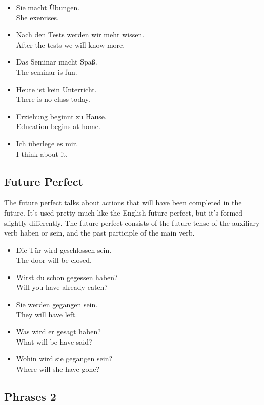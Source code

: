 \begin{itemize}
  \item  Sie macht {\"U}bungen. \\ 
  She exercises.
  \item  Nach den Tests werden wir mehr wissen. \\
  After the tests we will know more.
  \item  Das Seminar macht Spa{\ss}. \\
  The seminar is fun.
  \item  Heute ist kein Unterricht. \\
  There is no class today.
  \item  Erziehung beginnt zu Hause. \\
  Education begins at home.
  \item  Ich {\"u}berlege es mir. \\
  I think about it.
\end{itemize}


\pagebreak
\subsection{Future Perfect}

The future perfect talks about actions that will have been completed in the future. It's used pretty much like the English future perfect, but it's formed slightly differently.  The future perfect consists of the future tense of the auxiliary verb haben or sein, and the past participle of the main verb. 

\begin{itemize}
  \item  Die T{\"u}r wird geschlossen sein. \\
  The door will be closed.
  \item  Wirst du schon gegessen haben? \\
  Will you have already eaten?
  \item  Sie werden gegangen sein. \\
  They will have left.
  \item  Was wird er gesagt haben? \\
  What will be have said?
  \item  Wohin wird sie gegangen sein? \\
  Where will she have gone?
\end{itemize}


\pagebreak
\subsection{Phrases 2}

